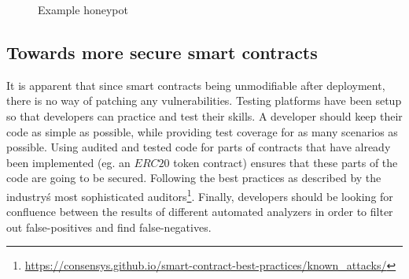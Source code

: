 \begin{figure}[ht!]
    \centering
    
    \caption{Example honeypot}
    \label{smart_contract}
\end{figure}

\subsection{Towards more secure smart contracts}
It is apparent that since smart contracts being unmodifiable after deployment, there is no way of patching any vulnerabilities. Testing platforms have been setup so that developers can practice and test their skills. A developer should keep their code as simple as possible, while providing test coverage for as many scenarios as possible. Using audited and tested code for parts of contracts that have already been implemented (eg. an $ERC20$ token contract) ensures that these parts of the code are going to be secured. Following the best practices as described by the industry\'s most sophisticated auditors\footnote{\url{https://consensys.github.io/smart-contract-best-practices/known_attacks/}}. Finally, developers should be looking for confluence between the results of different automated analyzers in order to filter out false-positives and find false-negatives.
